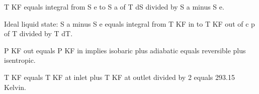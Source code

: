 T KF equals integral from S e to S a of T dS divided by S a minus S e.  

Ideal liquid state:  
S a minus S e equals integral from T KF in to T KF out of c p of T divided by T dT.  

P KF out equals P KF in implies isobaric plus adiabatic equals reversible plus isentropic.  

T KF equals T KF at inlet plus T KF at outlet divided by 2 equals 293.15 Kelvin.